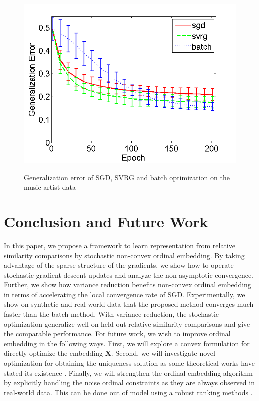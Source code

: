 \documentclass[letterpaper]{article}
\begin{document}
\begin{figure}
{				\includegraphics[scale=0.33]{Music_TSTE_200_test.png}
			}
			\caption{Generalization error of SGD, SVRG and batch optimization on the music artist data}
			\label{fig:3} %
		\end{figure}
		
		

		\section{Conclusion and Future Work}

		In this paper, we propose a framework to learn representation from relative similarity comparisons by stochastic non-convex ordinal embedding. By taking advantage of the sparse structure of the gradients, we show how to operate stochastic gradient descent updates and analyze the non-asymptotic convergence. Further, we show how variance reduction benefits non-convex ordinal embedding in terms of accelerating the local convergence rate of SGD. Experimentally, we show on synthetic and real-world data that the proposed method converges much faster than the batch method. With variance reduction, the stochastic optimization generalize well on held-out relative similarity comparisons and give the comparable performance. For future work, we wish to improve ordinal embedding in the following ways. First, we will explore a convex formulation for directly optimize the embedding $\mathbf{X}$. Second, we will investigate novel optimization for obtaining the uniqueness solution as some theoretical works have stated its existence \cite{2015arXiv150102861A,53e99af7b7602d97023851bf}. Finally, we will strengthen the ordinal embedding algorithm by explicitly handling the noise ordinal constraints as they are always observed in real-world data. This can be done out of model using a robust ranking methods \cite{2014arXiv1408.3467X}.

		
		

	
\end{document}

